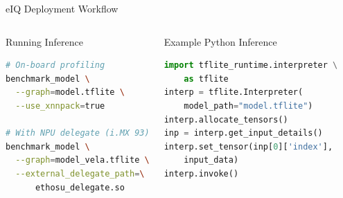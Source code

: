 \documentclass[aspectratio=169]{beamer}
\begin{document}
\begin{frame}{eIQ Deployment Workflow}
  \centering
  \vspace{10pt}
  \begin{columns}[T]
      \begin{block}{Running Inference}
        \begin{lstlisting}[language=bash]
# On-board profiling
benchmark_model \
  --graph=model.tflite \
  --use_xnnpack=true

# With NPU delegate (i.MX 93)
benchmark_model \
  --graph=model_vela.tflite \
  --external_delegate_path=\
      ethosu_delegate.so
        \end{lstlisting}
      \end{block}
    \column{0.48\textwidth}
      \begin{block}{Example Python Inference}
        \begin{lstlisting}[language=python]
import tflite_runtime.interpreter \
    as tflite
interp = tflite.Interpreter(
    model_path="model.tflite")
interp.allocate_tensors()
inp = interp.get_input_details()
interp.set_tensor(inp[0]['index'],
    input_data)
interp.invoke()
        \end{lstlisting}
      \end{block}
  \end{columns}
\end{frame}

\end{document}
